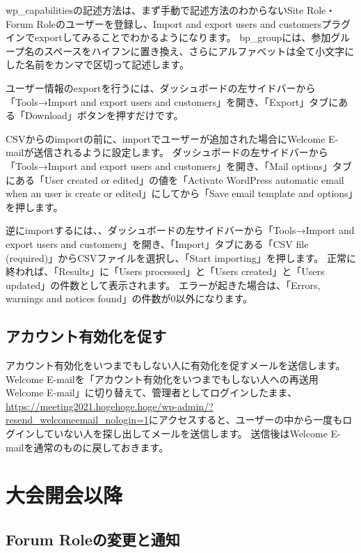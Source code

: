 \documentclass[titlepage,10pt,a4paper,uplatex]{jsbook}
\begin{document}
wp\_capabilitiesの記述方法は、まず手動で記述方法のわからないSite Role・Forum Roleのユーザーを登録し、Import and export users and customersプラグインでexportしてみることでわかるようになります。
bp\_groupには、参加グループ名のスペースをハイフンに置き換え、さらにアルファベットは全て小文字にした名前をカンマで区切って記述します。

ユーザー情報のexportを行うには、ダッシュボードの左サイドバーから「Tools→Import and export users and customers」を開き、「Export」タブにある「Download」ボタンを押すだけです。

CSVからのimportの前に、importでユーザーが追加された場合にWelcome E-mailが送信されるように設定します。
ダッシュボードの左サイドバーから「Tools→Import and export users and customers」を開き、「Mail options」タブにある「User created or edited」の値を「Activate WordPress automatic email when an user is create or edited」にしてから「Save email template and options」を押します。

逆にimportするには、、ダッシュボードの左サイドバーから「Tools→Import and export users and customers」を開き、「Import」タブにある「CSV file (required)」からCSVファイルを選択し、「Start importing」を押します。
正常に終われば、「Results」に「Users processed」と「Users created」と「Users updated」の件数として表示されます。
エラーが起きた場合は、「Errors, warnings and notices found」の件数が0以外になります。

\subsection{アカウント有効化を促す}

アカウント有効化をいつまでもしない人に有効化を促すメールを送信します。
Welcome E-mailを「アカウント有効化をいつまでもしない人への再送用Welcome E-mail」に切り替えて、管理者としてログインしたまま、\url{https://meeting2021.hogehoge.hoge/wp-admin/?resend_welcomeemail_nologin=1}にアクセスすると、ユーザーの中から一度もログインしていない人を探し出してメールを送信します。
送信後はWelcome E-mailを通常のものに戻しておきます。

\section{大会開会以降}

\subsection{Forum Roleの変更と通知}
\end{document}
